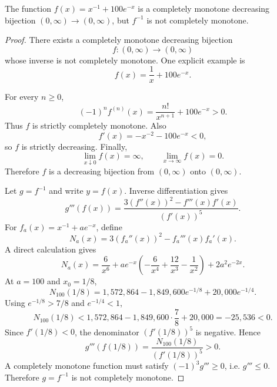 \begin{counterexample}
\label{res:keady-self-bijection-inverse-cm-negative-example}
The function \(f(x)=x^{-1}+100e^{-x}\) is a completely monotone decreasing bijection \((0,\infty)\to(0,\infty)\), but \(f^{-1}\) is not completely monotone.
\end{counterexample}
\begin{proof}
There exists a completely monotone decreasing bijection
\[
f:(0,\infty)\to(0,\infty)
\]
whose inverse is not completely monotone. One explicit example is
\[
f(x)=\frac1x+100e^{-x}.
\]

For every \(n\ge0\),
\[
(-1)^n f^{(n)}(x)=\frac{n!}{x^{n+1}}+100e^{-x}>0.
\]
Thus \(f\) is strictly completely monotone. Also
\[
f'(x)=-x^{-2}-100e^{-x}<0,
\]
so \(f\) is strictly decreasing. Finally,
\[
\lim_{x\downarrow0}f(x)=\infty,
\qquad
\lim_{x\to\infty}f(x)=0.
\]
Therefore \(f\) is a decreasing bijection from \((0,\infty)\) onto \((0,\infty)\).

Let \(g=f^{-1}\) and write \(y=f(x)\). Inverse differentiation gives
\[
g'''(f(x))=\frac{3(f''(x))^2-f'''(x)f'(x)}{(f'(x))^5}.
\]
For \(f_a(x)=x^{-1}+ae^{-x}\), define
\[
N_a(x)=3(f_a''(x))^2-f_a'''(x)f_a'(x).
\]
A direct calculation gives
\[
N_a(x)=\frac6{x^6}+ae^{-x}\left(-\frac6{x^4}+\frac{12}{x^3}-\frac1{x^2}\right)+2a^2e^{-2x}.
\]
At \(a=100\) and \(x_0=1/8\),
\[
N_{100}(1/8)=1{,}572{,}864-1{,}849{,}600e^{-1/8}+20{,}000e^{-1/4}.
\]
Using \(e^{-1/8}>7/8\) and \(e^{-1/4}<1\),
\[
N_{100}(1/8)<1{,}572{,}864-1{,}849{,}600\cdot\frac78+20{,}000=-25{,}536<0.
\]
Since \(f'(1/8)<0\), the denominator \((f'(1/8))^5\) is negative. Hence
\[
g'''(f(1/8))=\frac{N_{100}(1/8)}{(f'(1/8))^5}>0.
\]
A completely monotone function must satisfy \((-1)^3g'''\ge0\), i.e. \(g'''\le0\). Therefore \(g=f^{-1}\) is not completely monotone.
\end{proof}

